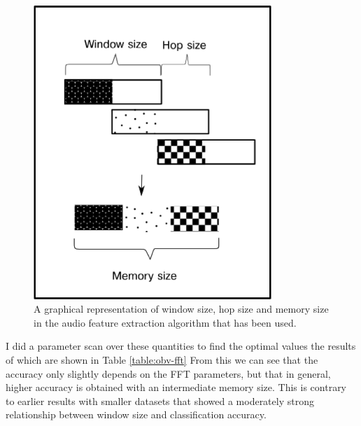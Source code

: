 \begin{figure}[h]
\centering
\includegraphics[width=90mm]{figures/dm_ws_hs_mem.png}
\caption{A graphical representation of window size, hop size and
  memory size in the audio feature extraction algorithm that has been
  used.}
\label{fig:dm_ws_hs_mem}
\end{figure}

I did a parameter scan over these quantities to find the optimal
values the results of which are shown in Table \ref{table:obv-fft}
From this we can see that the accuracy only slightly depends on the
FFT parameters, but that in general, higher accuracy is obtained with
an intermediate memory size.  This is contrary to earlier results
\cite{ness2011strategies} with smaller datasets that showed a
moderately strong relationship between window size and classification
accuracy.

